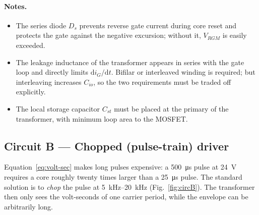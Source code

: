 \documentclass[11pt,a4paper]{article}
\begin{document}
\paragraph{Notes.}
\begin{itemize}
  \item The series diode $D_s$ prevents reverse gate current during core reset and
        protects the gate against the negative excursion; without it, $V_{RGM}$ is
        easily exceeded.
  \item The leakage inductance of the transformer appears in series with the gate
        loop and directly limits $\mathrm{d}i_G/\mathrm{d}t$. Bifilar or
        interleaved winding is required; but interleaving increases $C_{io}$, so
        the two requirements must be traded off explicitly.
  \item The local storage capacitor $C_{st}$ must be placed at the primary of the
        transformer, with minimum loop area to the MOSFET.
\end{itemize}

\subsection{Circuit B --- Chopped (pulse-train) driver}

Equation~\eqref{eq:volt-sec} makes long pulses expensive: a \SI{500}{\micro\second}
pulse at \SI{24}{\volt} requires a core roughly twenty times larger than a
\SI{25}{\micro\second} pulse. The standard solution is to \emph{chop} the pulse at
\SIrange{5}{20}{\kilo\hertz} (Fig.~\ref{fig:circB}). The transformer then only sees
the volt-seconds of one carrier period, while the envelope can be arbitrarily long.
\end{document}
